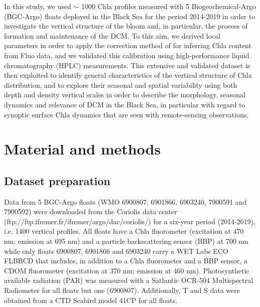 \documentclass[journal abbreviation, manuscript]{copernicus}
\begin{document}
In this study, we used $\sim$ 1000 Chla profiles measured with 5 Biogeochemical-Argo (BGC-Argo) floats deployed in the Black Sea for the period 2014-2019 in order to investigate the vertical structure of the bloom and, in particular, the process of formation and maintenance of the DCM. To this aim, we derived local parameters in order to apply the correction method of \citet{Xing2017} for inferring Chla content from Fluo data, and we validated this calibration using high-performance liquid chromatography (HPLC) measurements.
This extensive and validated dataset is then exploited to identify general characteristics of the vertical structure of Chla distribution, and to explore their seasonal and spatial variability using both depth and density vertical scales in order to describe the morphology, seasonal dynamics and relevance of DCM in the Black Sea, in particular with regard to synoptic surface Chla dynamics that are seen with remote-sensing observations.

\section{Material and methods}
\subsection{Dataset preparation}
Data from 5 BGC-Argo floats (WMO 6900807, 6901866, 6903240, 7900591 and 7900592) were downloaded from the Coriolis data center (ftp://ftp.ifremer.fr/ifremer/argo/dac/coriolis/) for a six-year period (2014-2019), i.e. 1400 vertical profiles. All floats have a Chla fluorometer (excitation at 470 \unit{nm}; emission at 695 \unit{nm}) and a particle backscattering sensor (BBP) at 700 \unit{nm} while only floats 6900807, 6901866 and 6903240 carry a WET Labs ECO FLBBCD that includes, in addition to a Chla fluorometer and a BBP sensor, a CDOM fluorometer (excitation at 370 \unit{nm}; emission at 460 \unit{nm}). Photosynthetic available radiation (PAR) was measured with a Satlantic OCR-504 Multispectral Radiometer for all floats but one (6900807). Additionally, T and S data were obtained from a CTD Seabird model 41CP for all floats.%
\end{document}
